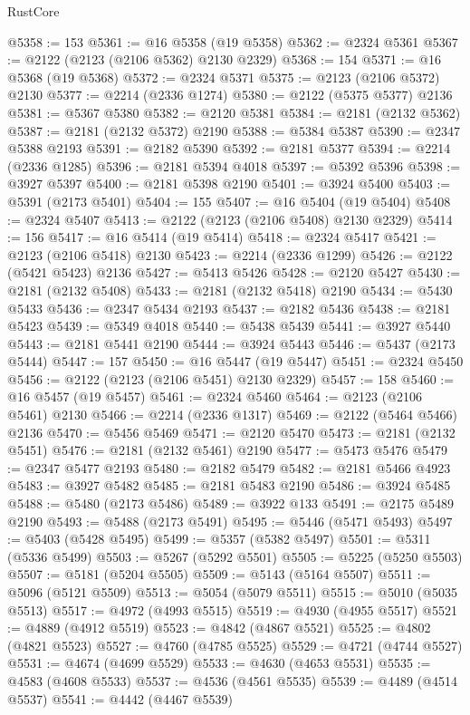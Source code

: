 \begin{lexlean}{RustCore}
\begin{coremodule}
@5358 := 153
@5361 := @16 @5358 (@19 @5358)
@5362 := @2324 @5361
@5367 := @2122 (@2123 (@2106 @5362) @2130 @2329)
@5368 := 154
@5371 := @16 @5368 (@19 @5368)
@5372 := @2324 @5371
@5375 := @2123 (@2106 @5372) @2130
@5377 := @2214 (@2336 @1274)
@5380 := @2122 (@5375 @5377) @2136
@5381 := @5367 @5380
@5382 := @2120 @5381
@5384 := @2181 (@2132 @5362)
@5387 := @2181 (@2132 @5372) @2190
@5388 := @5384 @5387
@5390 := @2347 @5388 @2193
@5391 := @2182 @5390
@5392 := @2181 @5377
@5394 := @2214 (@2336 @1285)
@5396 := @2181 @5394 @4018
@5397 := @5392 @5396
@5398 := @3927 @5397
@5400 := @2181 @5398 @2190
@5401 := @3924 @5400
@5403 := @5391 (@2173 @5401)
@5404 := 155
@5407 := @16 @5404 (@19 @5404)
@5408 := @2324 @5407
@5413 := @2122 (@2123 (@2106 @5408) @2130 @2329)
@5414 := 156
@5417 := @16 @5414 (@19 @5414)
@5418 := @2324 @5417
@5421 := @2123 (@2106 @5418) @2130
@5423 := @2214 (@2336 @1299)
@5426 := @2122 (@5421 @5423) @2136
@5427 := @5413 @5426
@5428 := @2120 @5427
@5430 := @2181 (@2132 @5408)
@5433 := @2181 (@2132 @5418) @2190
@5434 := @5430 @5433
@5436 := @2347 @5434 @2193
@5437 := @2182 @5436
@5438 := @2181 @5423
@5439 := @5349 @4018
@5440 := @5438 @5439
@5441 := @3927 @5440
@5443 := @2181 @5441 @2190
@5444 := @3924 @5443
@5446 := @5437 (@2173 @5444)
@5447 := 157
@5450 := @16 @5447 (@19 @5447)
@5451 := @2324 @5450
@5456 := @2122 (@2123 (@2106 @5451) @2130 @2329)
@5457 := 158
@5460 := @16 @5457 (@19 @5457)
@5461 := @2324 @5460
@5464 := @2123 (@2106 @5461) @2130
@5466 := @2214 (@2336 @1317)
@5469 := @2122 (@5464 @5466) @2136
@5470 := @5456 @5469
@5471 := @2120 @5470
@5473 := @2181 (@2132 @5451)
@5476 := @2181 (@2132 @5461) @2190
@5477 := @5473 @5476
@5479 := @2347 @5477 @2193
@5480 := @2182 @5479
@5482 := @2181 @5466 @4923
@5483 := @3927 @5482
@5485 := @2181 @5483 @2190
@5486 := @3924 @5485
@5488 := @5480 (@2173 @5486)
@5489 := @3922 @133
@5491 := @2175 @5489 @2190
@5493 := @5488 (@2173 @5491)
@5495 := @5446 (@5471 @5493)
@5497 := @5403 (@5428 @5495)
@5499 := @5357 (@5382 @5497)
@5501 := @5311 (@5336 @5499)
@5503 := @5267 (@5292 @5501)
@5505 := @5225 (@5250 @5503)
@5507 := @5181 (@5204 @5505)
@5509 := @5143 (@5164 @5507)
@5511 := @5096 (@5121 @5509)
@5513 := @5054 (@5079 @5511)
@5515 := @5010 (@5035 @5513)
@5517 := @4972 (@4993 @5515)
@5519 := @4930 (@4955 @5517)
@5521 := @4889 (@4912 @5519)
@5523 := @4842 (@4867 @5521)
@5525 := @4802 (@4821 @5523)
@5527 := @4760 (@4785 @5525)
@5529 := @4721 (@4744 @5527)
@5531 := @4674 (@4699 @5529)
@5533 := @4630 (@4653 @5531)
@5535 := @4583 (@4608 @5533)
@5537 := @4536 (@4561 @5535)
@5539 := @4489 (@4514 @5537)
@5541 := @4442 (@4467 @5539)

\end{coremodule}
\end{lexlean}
